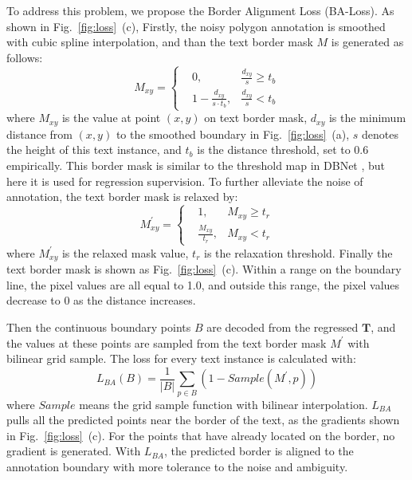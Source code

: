 \documentclass[sigconf]{acmart}
\begin{document}
	To address this problem, we propose the Border Alignment Loss (BA-Loss). As shown in Fig.~\ref{fig:loss}~(c),
	Firstly, the noisy polygon annotation is smoothed with cubic spline interpolation\cite{mckinley1998cubic}, and than
	the text border mask $M$  is generated as follows: 
	\begin{equation}
	M_{xy} = \left\{
	\begin{aligned}
	&0, &\frac{d_{xy}}{s} \geq t_b\\
	&1-\frac{d_{xy}}{s\cdot t_b}, &\frac{d_{xy}}{s} < t_b
	\end{aligned}
	\right.
	\end{equation}
	where $M_{xy}$ is the value at point $(x,y)$ on text border mask, $d_{xy}$ is the minimum distance from $(x,y)$ to the smoothed boundary in Fig.~\ref{fig:loss}~(a), $s$ denotes the height of this text instance, and $t_b$ is the distance threshold, set to 0.6 empirically. This border mask is similar to the threshold map in DBNet \cite{liao2020db}, but here it is used for regression supervision. To further alleviate the noise of annotation, the text border mask is relaxed by:
	\begin{equation}
	M_{xy}^{'} = \left\{
	\begin{aligned}
	&1, &M_{xy} \geq t_r\\
	&\frac{M_{xy}}{t_r}, &M_{xy} < t_r
	\end{aligned}
	\right.
	\end{equation}
	where $M^{'}_{xy}$ is the relaxed mask value, $t_r$ is the relaxation threshold.
	Finally the text border mask is shown as Fig.~\ref{fig:loss}~(c).  Within a range on the boundary line, the pixel values are all equal to 1.0, and outside this range, the pixel values decrease to 0 as the distance increases.
	
	Then the continuous boundary points $B$ are decoded from the regressed $\mathbf{T}$, and the values at these points are sampled from the text border mask $M^{'}$ with bilinear grid sample. The loss for every text instance is calculated with:
	\begin{equation}
	L_{BA}(B) = \frac{1}{|B|}\sum_{p\in B}(1 - Sample(M^{'},p))
	\end{equation}
	where $Sample$ means the grid sample function with bilinear interpolation. $L_{BA}$ pulls all the predicted points near the border of the text, as the gradients shown in Fig.~\ref{fig:loss}~(c). For the points that have already located on the border, no gradient is generated. With $L_{BA}$, the predicted border is aligned to the annotation boundary with more tolerance to the noise and ambiguity.
	
\end{document}
